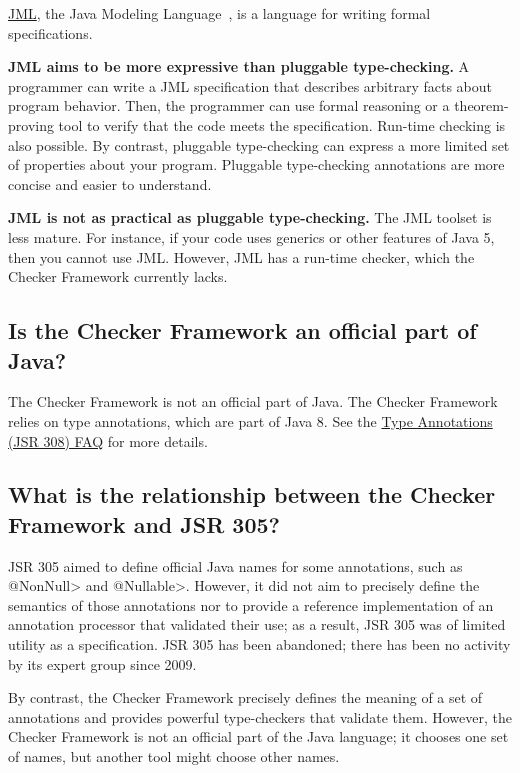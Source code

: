 \href{http://www.cs.ucf.edu/~leavens/JML/}{JML}, the Java Modeling
Language~\cite{LeavensBR2006:JML}, is a language for writing formal
specifications.

\textbf{JML aims to be more expressive than pluggable type-checking.}
A programmer can write a JML specification that
describes arbitrary facts about program behavior.  Then, the programmer can
use formal reasoning or a theorem-proving tool to verify that the code
meets the specification.  Run-time checking is also possible.
By contrast, pluggable type-checking can express a more limited set of
properties about your program.  Pluggable type-checking annotations are
more concise and easier to understand.

\textbf{JML is not as practical as pluggable type-checking.}
The JML toolset is less mature.  For instance, if your code uses
generics or other features of Java 5, then you cannot use JML.
However, JML has a run-time checker, which the Checker Framework currently
lacks.


\subsection{Is the Checker Framework an official part of Java?\label{faq-checker-framework-part-of-java}}

The Checker Framework is not an official part of Java.
The Checker Framework relies on
type annotations, which are part of Java 8.  See the
\href{http://types.cs.washington.edu/jsr308/current/jsr308-faq.html#pluggable-type-checking-in-java}{Type
  Annotations (JSR 308) FAQ} for more details.


\subsection{What is the relationship between the Checker Framework and JSR 305?\label{faq-jsr-305}}

JSR 305 aimed to define official Java names for some annotations, such as
\<@NonNull> and \<@Nullable>.  However, it did not aim to precisely define
the semantics of those annotations nor to provide a reference
implementation of an annotation processor that validated their use;
as a result, JSR 305 was of limited utility as a specification.
JSR 305 has been abandoned; there has been
no activity by its expert group since
2009.

By contrast, the Checker Framework precisely defines the meaning of a set
of annotations and provides powerful type-checkers that validate them.
However, the Checker Framework is not an official part of the Java
language; it chooses one set of names, but another tool might choose other
names.

